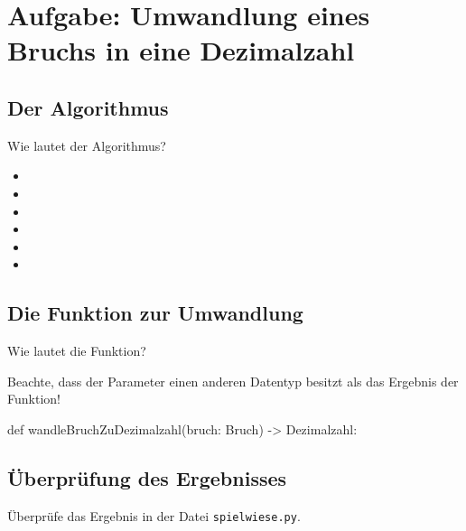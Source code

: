 \section{Aufgabe: Umwandlung eines Bruchs in eine Dezimalzahl}

\subsection*{Der Algorithmus}

Wie lautet der Algorithmus?

{\Large
	\begin{itemize}
		\item  
		\item  
		\item  
		\item  
		\item  
		\item  
	\end{itemize}
}

\subsection*{Die Funktion zur Umwandlung}

Wie lautet die Funktion?

Beachte, dass der Parameter einen anderen Datentyp besitzt als das Ergebnis der Funktion!

\begin{codePython}
def wandleBruchZuDezimalzahl(bruch: Bruch) -> Dezimalzahl:
\end{codePython}


\subsection*{Überprüfung des Ergebnisses}

Überprüfe das Ergebnis in der Datei \texttt{spielwiese.py}.